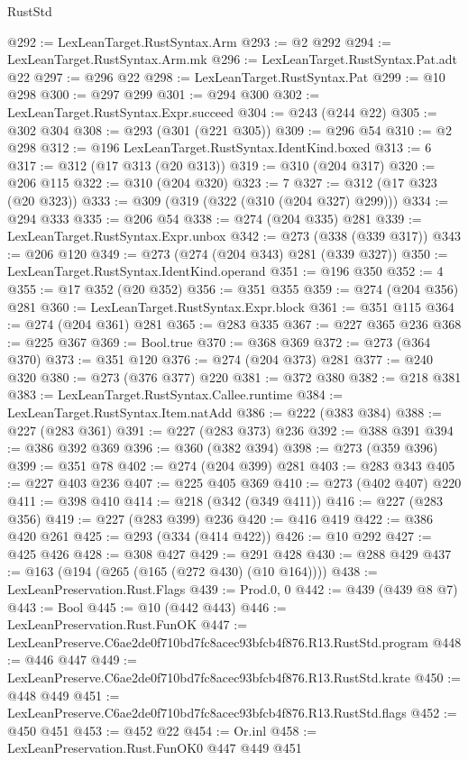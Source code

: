 \begin{lexlean}{RustStd}
\begin{coremodule}
@292 := LexLeanTarget.RustSyntax.Arm
@293 := @2 @292
@294 := LexLeanTarget.RustSyntax.Arm.mk
@296 := LexLeanTarget.RustSyntax.Pat.adt @22
@297 := @296 @22
@298 := LexLeanTarget.RustSyntax.Pat
@299 := @10 @298
@300 := @297 @299
@301 := @294 @300
@302 := LexLeanTarget.RustSyntax.Expr.succeed
@304 := @243 (@244 @22)
@305 := @302 @304
@308 := @293 (@301 (@221 @305))
@309 := @296 @54
@310 := @2 @298
@312 := @196 LexLeanTarget.RustSyntax.IdentKind.boxed
@313 := 6
@317 := @312 (@17 @313 (@20 @313))
@319 := @310 (@204 @317)
@320 := @206 @115
@322 := @310 (@204 @320)
@323 := 7
@327 := @312 (@17 @323 (@20 @323))
@333 := @309 (@319 (@322 (@310 (@204 @327) @299)))
@334 := @294 @333
@335 := @206 @54
@338 := @274 (@204 @335) @281
@339 := LexLeanTarget.RustSyntax.Expr.unbox
@342 := @273 (@338 (@339 @317))
@343 := @206 @120
@349 := @273 (@274 (@204 @343) @281 (@339 @327))
@350 := LexLeanTarget.RustSyntax.IdentKind.operand
@351 := @196 @350
@352 := 4
@355 := @17 @352 (@20 @352)
@356 := @351 @355
@359 := @274 (@204 @356) @281
@360 := LexLeanTarget.RustSyntax.Expr.block
@361 := @351 @115
@364 := @274 (@204 @361) @281
@365 := @283 @335
@367 := @227 @365 @236
@368 := @225 @367
@369 := Bool.true
@370 := @368 @369
@372 := @273 (@364 @370)
@373 := @351 @120
@376 := @274 (@204 @373) @281
@377 := @240 @320
@380 := @273 (@376 @377) @220
@381 := @372 @380
@382 := @218 @381
@383 := LexLeanTarget.RustSyntax.Callee.runtime
@384 := LexLeanTarget.RustSyntax.Item.natAdd
@386 := @222 (@383 @384)
@388 := @227 (@283 @361)
@391 := @227 (@283 @373) @236
@392 := @388 @391
@394 := @386 @392 @369
@396 := @360 (@382 @394)
@398 := @273 (@359 @396)
@399 := @351 @78
@402 := @274 (@204 @399) @281
@403 := @283 @343
@405 := @227 @403 @236
@407 := @225 @405 @369
@410 := @273 (@402 @407) @220
@411 := @398 @410
@414 := @218 (@342 (@349 @411))
@416 := @227 (@283 @356)
@419 := @227 (@283 @399) @236
@420 := @416 @419
@422 := @386 @420 @261
@425 := @293 (@334 (@414 @422))
@426 := @10 @292
@427 := @425 @426
@428 := @308 @427
@429 := @291 @428
@430 := @288 @429
@437 := @163 (@194 (@265 (@165 (@272 @430) (@10 @164))))
@438 := LexLeanPreservation.Rust.Flags
@439 := Prod.{0, 0}
@442 := @439 (@439 @8 @7)
@443 := Bool
@445 := @10 (@442 @443)
@446 := LexLeanPreservation.Rust.FunOK
@447 := LexLeanPreserve.C6ae2de0f710bd7fc8acec93bfcb4f876.R13.RustStd.program
@448 := @446 @447
@449 := LexLeanPreserve.C6ae2de0f710bd7fc8acec93bfcb4f876.R13.RustStd.krate
@450 := @448 @449
@451 := LexLeanPreserve.C6ae2de0f710bd7fc8acec93bfcb4f876.R13.RustStd.flags
@452 := @450 @451
@453 := @452 @22
@454 := Or.inl
@458 := LexLeanPreservation.Rust.FunOK0 @447 @449 @451

\end{coremodule}
\end{lexlean}
